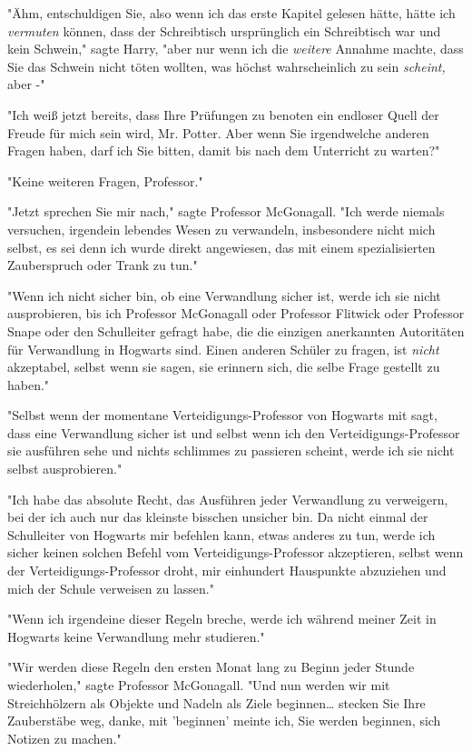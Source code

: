 {"Ähm, entschuldigen Sie, also wenn ich das erste Kapitel gelesen hätte, hätte ich \emph{vermuten} können, dass der Schreibtisch ursprünglich ein Schreibtisch war und kein Schwein," sagte Harry, "aber nur wenn ich die \emph{weitere} Annahme machte, dass Sie das Schwein nicht töten wollten, was höchst wahrscheinlich zu sein \emph{scheint,} aber -"

"Ich weiß jetzt bereits, dass Ihre Prüfungen zu benoten ein endloser Quell der Freude für mich sein wird, Mr. Potter. Aber wenn Sie irgendwelche anderen Fragen haben, darf ich Sie bitten, damit bis nach dem Unterricht zu warten?"

"Keine weiteren Fragen, Professor."

"Jetzt sprechen Sie mir nach," sagte Professor McGonagall. "Ich werde niemals versuchen, irgendein lebendes Wesen zu verwandeln, insbesondere nicht mich selbst, es sei denn ich wurde direkt angewiesen, das mit einem spezialisierten Zauberspruch oder Trank zu tun."

"Wenn ich nicht sicher bin, ob eine Verwandlung sicher ist, werde ich sie nicht ausprobieren, bis ich Professor McGonagall oder Professor Flitwick oder Professor Snape oder den Schulleiter gefragt habe, die die einzigen anerkannten Autoritäten für Verwandlung in Hogwarts sind. Einen anderen Schüler zu fragen, ist \emph{nicht} akzeptabel, selbst wenn sie sagen, sie erinnern sich, die selbe Frage gestellt zu haben."

"Selbst wenn der momentane Verteidigungs-Professor von Hogwarts mit sagt, dass eine Verwandlung sicher ist und selbst wenn ich den Verteidigungs-Professor sie ausführen sehe und nichts schlimmes zu passieren scheint, werde ich sie nicht selbst ausprobieren."

"Ich habe das absolute Recht, das Ausführen jeder Verwandlung zu verweigern, bei der ich auch nur das kleinste bisschen unsicher bin. Da nicht einmal der Schulleiter von Hogwarts mir befehlen kann, etwas anderes zu tun, werde ich sicher keinen solchen Befehl vom Verteidigungs-Professor akzeptieren, selbst wenn der Verteidigungs-Professor droht, mir einhundert Hauspunkte abzuziehen und mich der Schule verweisen zu lassen."

"Wenn ich irgendeine dieser Regeln breche, werde ich während meiner Zeit in Hogwarts keine Verwandlung mehr studieren."

"Wir werden diese Regeln den ersten Monat lang zu Beginn jeder Stunde wiederholen," sagte Professor McGonagall. "Und nun werden wir mit Streichhölzern als Objekte und Nadeln als Ziele beginnen… stecken Sie Ihre Zauberstäbe weg, danke, mit 'beginnen' meinte ich, Sie werden beginnen, sich Notizen zu machen."

}
